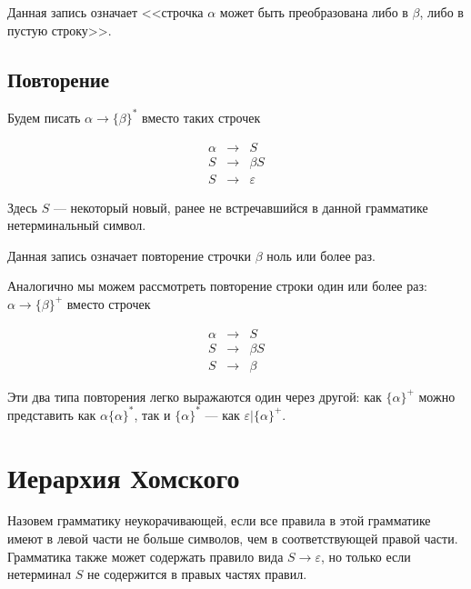 \documentclass[12pt,a4paper,oneside]{article}
\begin{document}
Данная запись означает <<строчка $\alpha$ может быть преобразована либо в $\beta$,
либо в пустую строку>>.

\subsection{Повторение}

Будем писать $\alpha \rightarrow \{\beta\}^*$ вместо таких строчек
\begin{bnf}\begin{eqnarray*}
\alpha &\rightarrow&S\\
S &\rightarrow& \beta S \\
S &\rightarrow& \varepsilon
\end{eqnarray*}\end{bnf}
\vspace{-0.3cm}

Здесь $S$ --- некоторый новый, ранее не встречавшийся в данной грамматике нетерминальный
символ. 

Данная запись означает повторение строчки $\beta$ ноль или более раз.

Аналогично мы можем рассмотреть повторение строки один или более раз:
$\alpha \rightarrow \{\beta\}^+$ вместо строчек
\begin{bnf}\begin{eqnarray*}
\alpha &\rightarrow&S\\
S &\rightarrow& \beta S \\
S &\rightarrow& \beta
\end{eqnarray*}\end{bnf}
\vspace{-0.3cm}

Эти два типа повторения легко выражаются один через другой: как $\{\alpha\}^+$ можно
представить как $\alpha\{\alpha\}^*$, так и $\{\alpha\}^*$ --- как $\varepsilon | \{\alpha\}^+$.

\section{Иерархия Хомского}

\begin{definition}
Назовем грамматику неукорачивающей, если все правила в этой
грамматике имеют в левой части не больше символов, чем
в соответствующей правой части.
Грамматика также может содержать правило вида $S \rightarrow \varepsilon$, но только
если нетерминал $S$ не содержится в правых частях правил.
\end{definition}
\end{document}
